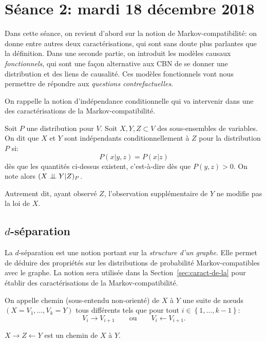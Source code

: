 \chapter{Séance 2: mardi 18 décembre 2018}
Dans cette séance, on revient d'abord sur la notion de Markov-compatibilité: on donne entre autres deux caractérisations, qui sont sans doute plus parlantes que la définition. Dans une seconde partie, on introduit les modèles causaux \emph{fonctionnels}, qui sont une façon alternative aux CBN de se donner une distribution et des liens de causalité. Ces modèles fonctionnels vont nous permettre de répondre aux \emph{questions contrefactuelles}.

On rappelle la notion d'indépendance conditionnelle qui va intervenir
dans une des caractérisations de la Markov-compatibilité.

\begin{definition}
Soit $P$ une distribution pour $V$.
Soit $X,Y,Z\subset V$ des sous-ensembles de variables.
On dit que $X$ et $Y$ sont indépendants conditionnellement à $Z$ pour la distribution $P$ si:
  \[ P(x|y,z)=P(x|z)  \]
dès que les quantités ci-dessus existent, c'est-à-dire dès que $P(y,z)>0$. On note alors $(X\perp\!\!\!\perp Y|Z)_P$.
\end{definition}
Autrement dit, ayant observé $Z$, l'observation supplémentaire de $Y$ ne modifie pas la loi de $X$.

\section{$d$-séparation}
\label{sec:d-separation}
La $d$-séparation est une notion portant sur la \emph{structure d'un
  graphe}. Elle permet de déduire des propriétés sur les distributions
de probabilité Markov-compatibles avec le graphe.
La notion sera utilisée dans la Section~\ref{sec:caract-de-la} pour
établir des caractérisations de la Markov-compatibilité.
\begin{definition}
On appelle chemin (sous-entendu non-orienté) de $X$ à $Y$ une suite de
n\oe uds $(X=V_1,\dots,V_k=Y)$ tous différents tels que pour tout $i\in \left\{ 1,\dots,k-1 \right\}$:
\[ V_i\to V_{i+1}\qquad \text{ou}\qquad V_i\leftarrow V_{i+1}. \]
\end{definition}
\begin{example}
$X\to Z\leftarrow Y$ est un chemin de $X$ à $Y$.
\end{example}

